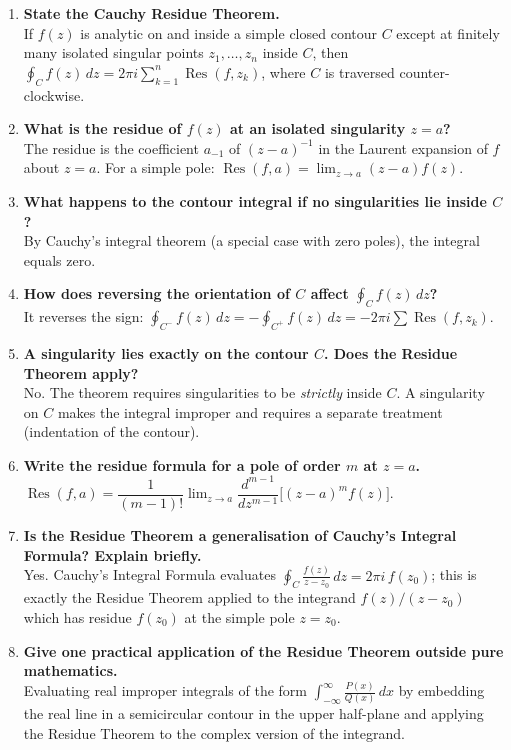 \documentclass[12pt,a4paper]{article}
\begin{document}
\begin{enumerate}[label=\textbf{Q\arabic*.}, leftmargin=*]

\item \textbf{State the Cauchy Residue Theorem.}\\
  If $f(z)$ is analytic on and inside a simple closed contour $C$ except at
  finitely many isolated singular points $z_1,\ldots,z_n$ inside $C$, then
  $\oint_C f(z)\,dz = 2\pi i \sum_{k=1}^{n}\operatorname{Res}(f,z_k)$,
  where $C$ is traversed counter-clockwise.

\item \textbf{What is the residue of $f(z)$ at an isolated singularity $z=a$?}\\
  The residue is the coefficient $a_{-1}$ of $(z-a)^{-1}$ in the Laurent
  expansion of $f$ about $z=a$. For a simple pole: $\operatorname{Res}(f,a)
  = \lim_{z\to a}(z-a)f(z)$.

\item \textbf{What happens to the contour integral if no singularities lie inside $C$?}\\
  By Cauchy's integral theorem (a special case with zero poles), the integral
  equals zero.

\item \textbf{How does reversing the orientation of $C$ affect $\oint_C f(z)\,dz$?}\\
  It reverses the sign: $\oint_{C^-}f(z)\,dz = -\oint_{C^+}f(z)\,dz =
  -2\pi i\sum\operatorname{Res}(f,z_k)$.

\item \textbf{A singularity lies exactly on the contour $C$. Does the Residue
  Theorem apply?}\\
  No. The theorem requires singularities to be \emph{strictly} inside $C$.
  A singularity on $C$ makes the integral improper and requires a separate
  treatment (indentation of the contour).

\item \textbf{Write the residue formula for a pole of order $m$ at $z=a$.}\\
  $\operatorname{Res}(f,a) = \dfrac{1}{(m-1)!}\displaystyle\lim_{z\to a}
  \dfrac{d^{m-1}}{dz^{m-1}}\bigl[(z-a)^m f(z)\bigr]$.

\item \textbf{Is the Residue Theorem a generalisation of Cauchy's Integral Formula?
  Explain briefly.}\\
  Yes. Cauchy's Integral Formula evaluates $\oint_C \frac{f(z)}{z-z_0}\,dz =
  2\pi i\,f(z_0)$; this is exactly the Residue Theorem applied to the integrand
  $f(z)/(z-z_0)$ which has residue $f(z_0)$ at the simple pole $z=z_0$.

\item \textbf{Give one practical application of the Residue Theorem outside pure
  mathematics.}\\
  Evaluating real improper integrals of the form $\int_{-\infty}^{\infty}
  \frac{P(x)}{Q(x)}\,dx$ by embedding the real line in a semicircular contour
  in the upper half-plane and applying the Residue Theorem to the complex
  version of the integrand.

\end{enumerate}
\end{document}
